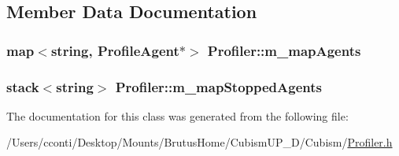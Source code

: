 \subsection{Member Data Documentation}
\hypertarget{class_profiler_a289df33e2c71075ff9bf2d2c3e180c02}{}
\subsubsection[{m\+\_\+map\+Agents}]{\setlength{\rightskip}{0pt plus 5cm}map$<${\bf string}, {\bf Profile\+Agent}$\ast$$>$ Profiler\+::m\+\_\+map\+Agents\hspace{0.3cm}{\ttfamily [protected]}}\label{class_profiler_a289df33e2c71075ff9bf2d2c3e180c02}
\hypertarget{class_profiler_a898eec43a1f9c8ed482d169e90f4a7bd}{}
\subsubsection[{m\+\_\+map\+Stopped\+Agents}]{\setlength{\rightskip}{0pt plus 5cm}stack$<${\bf string}$>$ Profiler\+::m\+\_\+map\+Stopped\+Agents\hspace{0.3cm}{\ttfamily [protected]}}\label{class_profiler_a898eec43a1f9c8ed482d169e90f4a7bd}


The documentation for this class was generated from the following file\+:\begin{DoxyCompactItemize}
\item 
/\+Users/cconti/\+Desktop/\+Mounts/\+Brutus\+Home/\+Cubism\+U\+P\+\_\+D/\+Cubism/\hyperlink{_profiler_8h}{Profiler.\+h}\end{DoxyCompactItemize}
